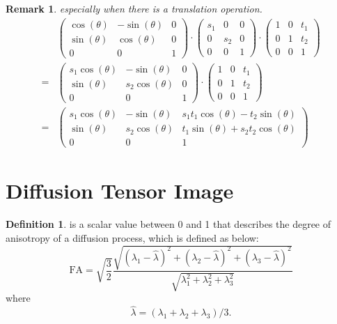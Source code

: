 \documentclass[a4paper]{article}
\theoremstyle{definition}
\newtheorem{definition}{Definition}
\theoremstyle{plain}
\newtheorem{remark}{Remark}
\begin{document}
\begin{remark}
especially when there is a translation operation.
\begin{align*}
    &
    \begin{pmatrix} 
        \cos(\theta) & -\sin(\theta) & 0\\ 
        \sin(\theta) & \cos(\theta) & 0\\ 
        0 & 0 & 1
    \end{pmatrix}\cdot
    \begin{pmatrix} 
        s_{1} & 0 & 0\\ 
        0 & s_{2} & 0\\ 
        0 & 0 & 1
    \end{pmatrix}\cdot
    \begin{pmatrix} 
        1 & 0 & t_1\\ 
        0 & 1 & t_2\\ 
        0 & 0 & 1
    \end{pmatrix}\\
    =&\begin{pmatrix} 
        s_1\cos(\theta) & -\sin(\theta) & 0\\ 
        \sin(\theta) & s_2\cos(\theta) & 0\\ 
        0 & 0 & 1
    \end{pmatrix}\cdot
    \begin{pmatrix} 
        1 & 0 & t_1\\ 
        0 & 1 & t_2\\ 
        0 & 0 & 1
    \end{pmatrix}\\
    =&\begin{pmatrix} 
        s_1\cos(\theta) & -\sin(\theta) & s_1t_1\cos(\theta)-t_2\sin(\theta)\\ 
        \sin(\theta) & s_2\cos(\theta) & t_1\sin(\theta)+s_2t_2\cos(\theta)\\ 
        0 & 0 & 1
    \end{pmatrix}
\end{align*}
\end{remark}

\newpage
\section{Diffusion Tensor Image}
\begin{definition}
 is a scalar value between 0 and 1 that describes the degree of anisotropy of a diffusion process, which is defined as below:
\begin{equation*}
    {\text{FA}}={\sqrt  {{\frac  {3}{2}}}}{\frac  {{\sqrt  {(\lambda _{1}-{\hat  {\lambda }})^{2}+(\lambda _{2}-{\hat  {\lambda }})^{2}+(\lambda _{3}-{\hat  {\lambda }})^{2}}}}{{\sqrt  {\lambda _{1}^{2}+\lambda _{2}^{2}+\lambda _{3}^{2}}}}}
\end{equation*}
where
\begin{equation*}
     {\hat {\lambda }}=(\lambda _{1}+\lambda _{2}+\lambda _{3})/3.
\end{equation*}
\end{definition}
\end{document}
